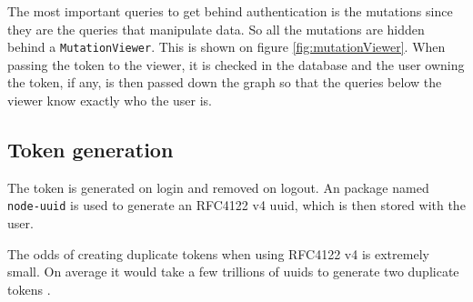 The most important queries to get behind authentication is the mutations since they are the queries that manipulate data. 
So all the mutations are hidden behind a \verb+MutationViewer+. 
This is shown on figure \ref{fig:mutationViewer}. 
When passing the token to the viewer, it is checked in the database and the user owning the token, if any, is then passed down the graph so that the queries below the viewer know exactly who the user is. 


\subsection{Token generation}
The token is generated on login and removed on logout. 
An  package named \verb+node-uuid+ is used to generate an RFC4122 v4 \gls{uuid}, which is then stored with the user. 

The odds of creating duplicate tokens when using RFC4122 v4 is extremely small. 
On average it would take a few trillions of \gls{uuid}s to generate two duplicate tokens \citep{authentication:uuid}.

